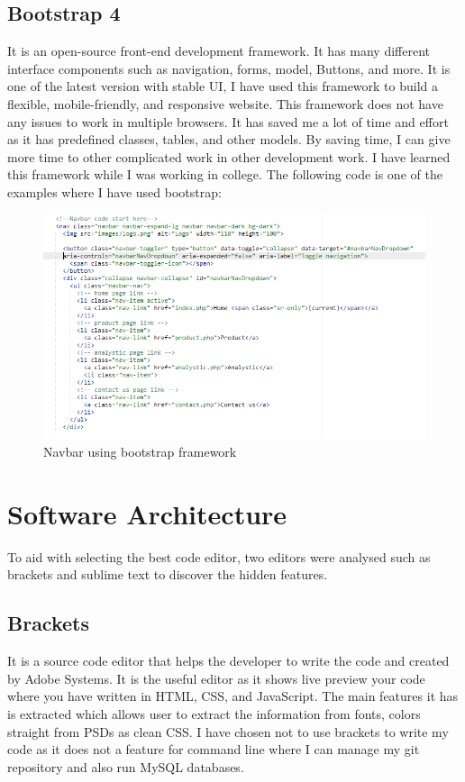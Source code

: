 \newpage
\subsection{Bootstrap 4}
It is an open-source front-end development framework. It has many different interface components such as navigation, forms, model, Buttons, and more. It is one of the latest version with stable UI, I have used this framework to build a flexible, mobile-friendly, and responsive website. This framework does not have any issues to work in multiple browsers. It has saved me a lot of time and effort as it has predefined classes, tables, and other models. By saving time, I can give more time to other complicated work in other development work. I have learned this framework while I was working in college. The following code is one of the examples where I have used bootstrap:
\begin{figure}[h]
\centering
    \includegraphics[scale=0.7]
    {images/navbar.png}
    \caption{Navbar using bootstrap framework}
    \label{fig: Navbar using bootstrap framework}
\end{figure}

\newpage
\section{Software Architecture}
To aid with selecting the best code editor, two editors were analysed such as brackets and sublime text to discover the hidden features.

\subsection{Brackets}
It is a source code editor that helps the developer to write the code and created by Adobe Systems. It is the useful editor as it shows live preview your code where you have written in HTML, CSS, and JavaScript. The main features it has is extracted which allows user to extract the information from fonts, colors straight from PSDs as clean CSS. I have chosen not to use brackets to write my code as it does not a feature for command line where I can manage my git repository and also run MySQL databases. 

